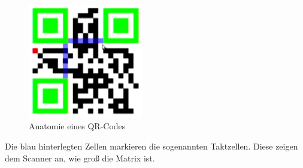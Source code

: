 \begin{figure}[htbp]
	\centering
	\includegraphics[width=5cm]{Bilder/QR_Code_Anatomie.png}
	\caption[Anatomie eines QR-Codes]{Anatomie eines QR-Codes\footnotemark}
	\label{fig:qranatomy}
	\hfill
\end{figure}

Die blau hinterlegten Zellen markieren die sogenannten Taktzellen. Diese zeigen dem Scanner an, wie groß die Matrix ist.


\pagebreak
